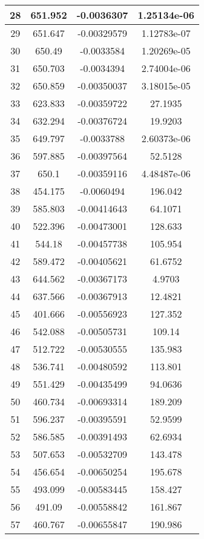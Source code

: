 \begin{table}[h]
{\begin{tabular}{|c|c|c|c|}
28	&	651.952	&	-0.0036307	&	1.25134e-06	\\	\hline
29	&	651.647	&	-0.00329579	&	1.12783e-07	\\	\hline
30	&	650.49	&	-0.0033584	&	1.20269e-05	\\	\hline
31	&	650.703	&	-0.0034394	&	2.74004e-06	\\	\hline
32	&	650.859	&	-0.00350037	&	3.18015e-05	\\	\hline
33	&	623.833	&	-0.00359722	&	27.1935	\\	\hline
34	&	632.294	&	-0.00376724	&	19.9203	\\	\hline
35	&	649.797	&	-0.0033788	&	2.60373e-06	\\	\hline
36	&	597.885	&	-0.00397564	&	52.5128	\\	\hline
37	&	650.1	&	-0.00359116	&	4.48487e-06	\\	\hline
38	&	454.175	&	-0.0060494	&	196.042	\\	\hline
39	&	585.803	&	-0.00414643	&	64.1071	\\	\hline
40	&	522.396	&	-0.00473001	&	128.633	\\	\hline
41	&	544.18	&	-0.00457738	&	105.954	\\	\hline
42	&	589.472	&	-0.00405621	&	61.6752	\\	\hline
43	&	644.562	&	-0.00367173	&	4.9703	\\	\hline
44	&	637.566	&	-0.00367913	&	12.4821	\\	\hline
45	&	401.666	&	-0.00556923	&	127.352	\\	\hline
46	&	542.088	&	-0.00505731	&	109.14	\\	\hline
47	&	512.722	&	-0.00530555	&	135.983	\\	\hline
48	&	536.741	&	-0.00480592	&	113.801	\\	\hline
49	&	551.429	&	-0.00435499	&	94.0636	\\	\hline
50	&	460.734	&	-0.00693314	&	189.209	\\	\hline
51	&	596.237	&	-0.00395591	&	52.9599	\\	\hline
52	&	586.585	&	-0.00391493	&	62.6934	\\	\hline
53	&	507.653	&	-0.00532709	&	143.478	\\	\hline
54	&	456.654	&	-0.00650254	&	195.678	\\	\hline
55	&	493.099	&	-0.00583445	&	158.427	\\	\hline
56	&	491.09	&	-0.00558842	&	161.867	\\	\hline
57	&	460.767	&	-0.00655847	&	190.986	\\	\hline

\end{tabular}}
\end{table}

